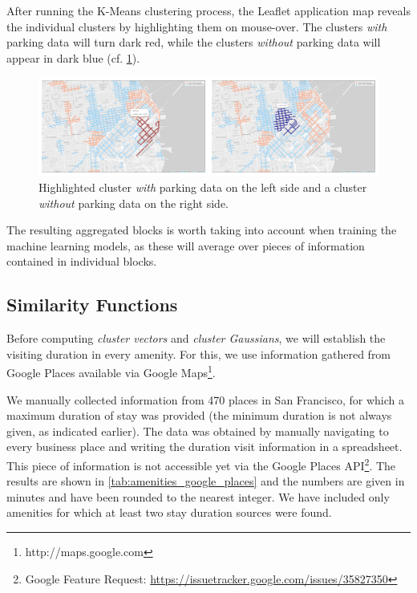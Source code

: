 After running the K-Means clustering process, the Leaflet application map reveals the individual clusters by highlighting them on mouse-over.
The clusters \textit{with} parking data will turn dark red, while the clusters \textit{without} parking data will appear in dark blue (cf. \ref{fig:highlighted_collage}). 

\begin{figure}[!ht]
	\centering
	\includegraphics[width=\textwidth]{graphics/highlighted_collage.png}
	\caption{Highlighted cluster \textit{with} parking data on the left side and a cluster \textit{without} parking data on the right side.}
	\label{fig:highlighted_collage}
\end{figure}

The resulting aggregated blocks is worth taking into account when training the machine learning models, as these will average over pieces of information contained in individual blocks. 

\subsection{Similarity Functions}
\label{evaluation:urban_measure}
Before computing \textit{cluster vectors} and \textit{cluster Gaussians}, we will establish the visiting duration in every amenity.
For this, we use information gathered from Google Places available via Google Maps\footnote{http://maps.google.com}.

We manually collected information from 470 places in San Francisco, for which a maximum duration of stay was provided (the minimum duration is not always given, as indicated earlier).
The data was obtained by manually navigating to every business place and writing the duration visit information in a spreadsheet.
This piece of information is not accessible yet via the Google Places API\footnote{Google Feature Request: \url{https://issuetracker.google.com/issues/35827350}}.
The results are shown in \ref{tab:amenities_google_places} and the numbers are given in minutes and have been rounded to the nearest integer. We have included only amenities for which at least two stay duration sources were found. 

